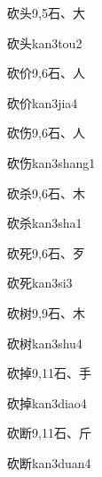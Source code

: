\begin{entry}{砍头}{9,5}{⽯、⼤}
  \begin{phonetics}{砍头}{kan3tou2}
  \end{phonetics}
\end{entry}

\begin{entry}{砍价}{9,6}{⽯、⼈}
  \begin{phonetics}{砍价}{kan3jia4}
  \end{phonetics}
\end{entry}

\begin{entry}{砍伤}{9,6}{⽯、⼈}
  \begin{phonetics}{砍伤}{kan3shang1}
  \end{phonetics}
\end{entry}

\begin{entry}{砍杀}{9,6}{⽯、⽊}
  \begin{phonetics}{砍杀}{kan3sha1}
  \end{phonetics}
\end{entry}

\begin{entry}{砍死}{9,6}{⽯、⽍}
  \begin{phonetics}{砍死}{kan3si3}
  \end{phonetics}
\end{entry}

\begin{entry}{砍树}{9,9}{⽯、⽊}
  \begin{phonetics}{砍树}{kan3shu4}
  \end{phonetics}
\end{entry}

\begin{entry}{砍掉}{9,11}{⽯、⼿}
  \begin{phonetics}{砍掉}{kan3diao4}
  \end{phonetics}
\end{entry}

\begin{entry}{砍断}{9,11}{⽯、⽄}
  \begin{phonetics}{砍断}{kan3duan4}
  \end{phonetics}
\end{entry}

